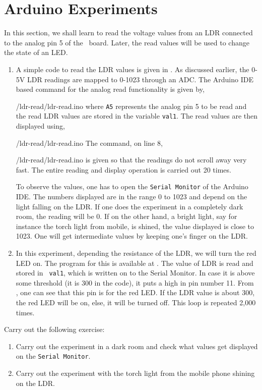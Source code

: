 \section{Arduino Experiments}
In this section, we shall learn to read the voltage values from an LDR connected to the analog pin 5 of the \arduino\ board. Later, the read values will be used to change the state of an LED.  
\begin{enumerate}
\item A simple code to read the LDR values is given in
  . As discussed earlier, the 0-5V LDR readings
  are mapped to 0-1023 through an ADC. The 
  Arduino IDE
  based command for the analog read functionality is given by,
  
  {\LocLDRardcode/ldr-read/ldr-read.ino} where {\tt A5} represents the
  analog pin 5 to be read and the read LDR values are stored in the
  variable {\tt val1}.  The read values are then displayed using,
  
  {\LocLDRardcode/ldr-read/ldr-read.ino} The command, on line 8,
  
  {\LocLDRardcode/ldr-read/ldr-read.ino} is given so that the readings
  do not scroll away very fast.  The entire reading and display
  operation is carried out 20 times.

  To observe the values, one has to open the {\tt Serial Monitor} of
  the Arduino IDE.  The numbers displayed are in the range 0 to 1023
  and depend on the light falling on the LDR.  If one does the
  experiment in a completely dark room, the reading will be 0.  If on
  the other hand, a bright light, say for instance the torch light
  from mobile, is shined, the value displayed is close to 1023.  One
  will get intermediate values by keeping one's finger on the LDR.

\item In this experiment, depending the resistance of the LDR, we will
  turn the red LED on.  The program for this is available at
  .  The value of LDR is read and stored in {\tt
    val1}, which is written on to the Serial Monitor.  In case it is
  above some threshold (it is 300 in the code), it puts a high in pin
  number 11.  From , one can see that this pin is
  for the red LED.  If the LDR value is about 300, the red LED will be
  on, else, it will be turned off.  This loop is repeated 2,000 times.
\end{enumerate}

\begin{exercise}
Carry out the following exercise:
\begin{enumerate}
\item Carry out the experiment in a dark room and check what values
  get displayed on the {\tt Serial Monitor}.
\item Carry out the experiment with the torch light from the mobile
  phone shining on the LDR.
\end{enumerate}
\end{exercise}

